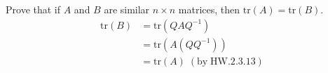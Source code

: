 Prove that if $A$ and $B$ are similar $n\times n$ matrices, then
$\text{tr}(A)= \text{tr}(B)$.
\begin{align}
\text{tr}(B) &= \text{tr}(QAQ^{-1})\\
&= \text{tr}(A(QQ^{-1}))\\
&= \text{tr}(A) \; (\text{by}\; \text{HW}.2.3.13)
\end{align}
